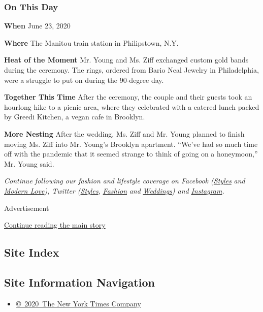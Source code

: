 \hypertarget{on-this-day}{%
\subsubsection{On This Day}\label{on-this-day}}

\textbf{When} June 23, 2020

\textbf{Where} The Manitou train station in Philipstown, N.Y.

\textbf{Heat of the Moment} Mr. Young and Ms. Ziff exchanged custom gold
bands during the ceremony. The rings, ordered from Bario Neal Jewelry in
Philadelphia, were a struggle to put on during the 90-degree day.

\textbf{Together This Time} After the ceremony, the couple and their
guests took an hourlong hike to a picnic area, where they celebrated
with a catered lunch packed by Greedi Kitchen, a vegan cafe in Brooklyn.

\textbf{More Nesting} After the wedding, Ms. Ziff and Mr. Young planned
to finish moving Ms. Ziff into Mr. Young's Brooklyn apartment. ``We've
had so much time off with the pandemic that it seemed strange to think
of going on a honeymoon,'' Mr. Young said.

\emph{Continue following our fashion and lifestyle coverage on Facebook
(}\href{https://www.facebook.com/nytimesstyles}{\emph{Styles}}
\emph{and} \href{https://www.facebook.com/modernlove}{\emph{Modern
Love}}\emph{), Twitter
(}\href{https://twitter.com/nytstyles}{\emph{Styles}}\emph{,}
\href{https://twitter.com/nytfashion}{\emph{Fashion}} \emph{and}
\href{https://twitter.com/nytimesvows}{\emph{Weddings}}\emph{) and}
\href{https://instagram.com/nytimesfashion}{\emph{Instagram}}\emph{.}

Advertisement

\protect\hyperlink{after-bottom}{Continue reading the main story}

\hypertarget{site-index}{%
\subsection{Site Index}\label{site-index}}

\hypertarget{site-information-navigation}{%
\subsection{Site Information
Navigation}\label{site-information-navigation}}

\begin{itemize}
\tightlist
\item
  \href{https://help.nytimes.com/hc/en-us/articles/115014792127-Copyright-notice}{©~2020~The
  New York Times Company}
\end{itemize}

